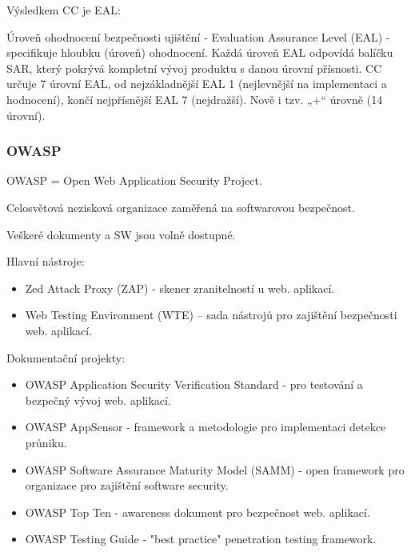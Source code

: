 Výsledkem CC je EAL:

Úroveň ohodnocení bezpečnosti ujištění - Evaluation Assurance Level (EAL) - specifikuje hloubku (úroveň) ohodnocení. Každá úroveň EAL odpovídá balíčku SAR, který pokrývá kompletní vývoj produktu s danou úrovní přísnosti. CC určuje 7 úrovní EAL, od nejzákladnější EAL 1 (nejlevnější na implementaci a hodnocení), končí nejpřísnější EAL 7 (nejdražší). Nově i tzv. „+“ úrovně (14 úrovní).
    
\subsubsection{OWASP}
OWASP = Open Web Application Security Project.

Celosvětová nezisková organizace zaměřená na softwarovou bezpečnost.

Veškeré dokumenty a SW jsou volně dostupné.

Hlavní nástroje:
\begin{itemize}
    \item Zed Attack Proxy (ZAP) - skener zranitelností u web. aplikací.
    \item Web Testing Environment (WTE) – sada nástrojů pro zajištění bezpečnosti web. aplikací.
\end{itemize}

Dokumentační projekty:
\begin{itemize}
    \item OWASP Application Security Verification Standard - pro testování a bezpečný vývoj web. aplikací.
    \item OWASP AppSensor - framework a metodologie pro implementaci detekce průniku.
    \item OWASP Software Assurance Maturity Model (SAMM) - open framework pro organizace pro zajištění software security.
    \item OWASP Top Ten - awareness dokument pro bezpečnost web. aplikací.
    \item OWASP Testing Guide - "best practice" penetration testing framework.
\end{itemize}
